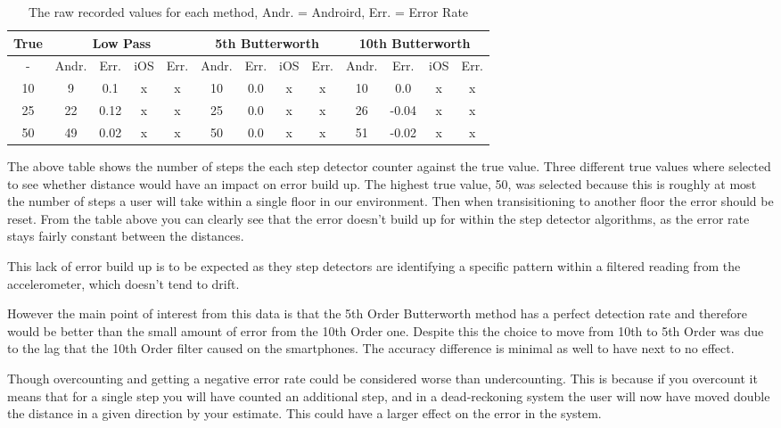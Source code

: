 \documentclass[main.tex]{subfiles}
\begin{document}
\begin{table}[ht]
	\begin{tabular}{| c || c | c | c | c | c | c | c | c | c | c | c | c |}
		\hline
		True & \multicolumn{4}{|c|}{Low Pass} & \multicolumn{4}{|c|}{5th Butterworth} & \multicolumn{4}{|c|}{10th Butterworth} \\
		\hline
		 - & Andr. & Err. & iOS & Err. & Andr. & Err. & iOS & Err. & Andr. & Err. & iOS & Err.\\
		\hline
		10 & 9 & 0.1 & x & x & 10 & 0.0 & x & x & 10 & 0.0 & x & x\\ 		
		25 & 22 & 0.12 & x & x & 25 & 0.0 & x & x & 26 & -0.04 & x & x \\ 	
		50 & 49 & 0.02 & x & x & 50 & 0.0 & x & x & 51 & -0.02 & x & x\\ 
		\hline	
	\end{tabular}
	\caption{The raw recorded values for each method, Andr. = Androird, Err. = Error Rate}
\end{table}

The above table shows the number of steps the each step detector counter against the true value. Three different true values where selected to see whether distance would have an impact on error build up. The highest true value, 50, was selected because this is roughly at most the number of steps a user will take within a single floor in our environment. Then when transisitioning to another floor the error should be reset. From the table above you can clearly see that the error doesn't build up for within the step detector algorithms, as the error rate stays fairly constant between the distances. 

This lack of error build up is to be expected as they step detectors are identifying a specific pattern within a filtered reading from the accelerometer, which doesn't tend to drift.

However the main point of interest from this data is that the 5th Order Butterworth method has a perfect detection rate and therefore would be better than the small amount of error from the 10th Order one. Despite this the choice to move from 10th to 5th Order was due to the lag that the 10th Order filter caused on the smartphones. The accuracy difference is minimal as well to have next to no effect. 

Though overcounting and getting a negative error rate could be considered worse than undercounting. This is because if you overcount it means that for a single step you will have counted an additional step, and in a dead-reckoning system the user will now have moved double the distance in a given direction by your estimate. This could have a larger effect on the error in the system.
\end{document}
